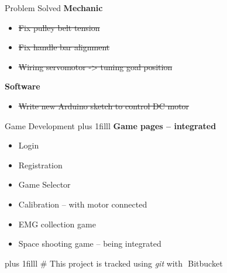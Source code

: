 \documentclass[10pt]{beamer}
\newcommand{\vfillall}{\vskip0pt plus 1filll}
\begin{document}
\begin{frame}{Problem Solved}
	\large \textbf{Mechanic}
	\normalsize
	\begin{itemize}
		\item \sout{Fix pulley belt tension}
		\item \sout{Fix handle bar alignment}
		\item \sout{Wiring servomotor -> tuning goal position}
	\end{itemize}
	
	\large \textbf{Software}
	\normalsize
	\begin{itemize}
		\item \sout{Write new Arduino sketch to control DC motor}
	\end{itemize}
\end{frame}

\begin{frame}{Game Development}
	\vfillall
	\large \textbf{Game pages – integrated}
	\begin{itemize}
		\item Login
		\item Registration
		\item Game Selector
		\item Calibration – with motor connected
		\item EMG collection game 
		\item Space shooting game – \alert{being integrated}
	\end{itemize}
	\vfillall
	\centering \footnotesize \# This project is tracked using \emph{git} with \,{\color{blue!52!cyan}\faBitbucket \,Bitbucket}
	\smallskip
\end{frame}
\end{document}
